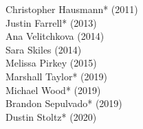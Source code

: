 \begin{multicols}{2}
    \noindent
    Christopher Hausmann\textcolor{uclablue}{*} (2011) \\
    Justin Farrell\textcolor{uclablue}{*} (2013) \\
    Ana Velitchkova (2014) \\
    Sara Skiles (2014) \\
    Melissa Pirkey (2015) \\
    Marshall Taylor\textcolor{uclablue}{*} (2019) \\
    Michael Wood\textcolor{uclablue}{*} (2019) \\
    Brandon Sepulvado\textcolor{uclablue}{*} (2019) \\
    Dustin Stoltz\textcolor{uclablue}{*} (2020) 
\end{multicols}
\medskip
